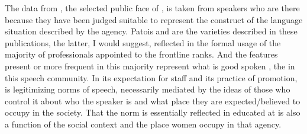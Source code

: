   The data from , the selected public face of , is taken from speakers who are there because they have been judged suitable to represent the construct of the language situation described by the agency.  Patois and  are the varieties described in these publications, the latter, I would suggest, reflected in the formal usage of the majority of professionals appointed to the frontline ranks.  And the features present or more frequent in this majority represent what is good spoken , the  in this speech community.  In its expectation for staff and its practice of promotion,  is legitimizing norms of speech, necessarily mediated by the ideas of those who control it about who the speaker is and what place they are expected\slash believed to occupy in the society.  That the norm is essentially reflected in educated  at  is also a function of the social context and the place women occupy in that agency.    

